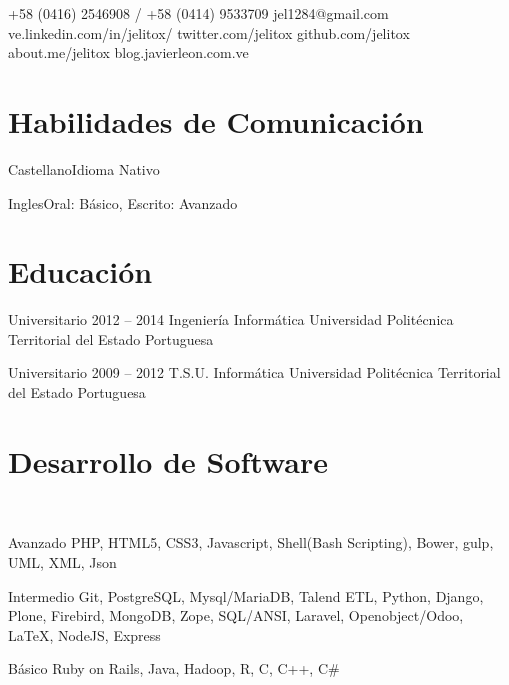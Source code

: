 \documentclass{tccv}
\begin{document}
    {+58 (0416) 2546908 / +58 (0414) 9533709}
    {jel1284@gmail.com}
    {ve.linkedin.com/in/jelitox/}
    {twitter.com/jelitox}
    {github.com/jelitox}
    {about.me/jelitox}
    {blog.javierleon.com.ve}

\section{Habilidades de Comunicaci\'on}

\begin{idiomas}
\item{Castellano}{Idioma Nativo}
\item{Ingles}{Oral: B\'asico, Escrito: Avanzado}
\end{idiomas}
\section{Educaci\'on}

\begin{estudios}

\item[Universitario]{2012 -- 2014}
     {Ingenier\'ia Inform\'atica}
     {Universidad Polit\'ecnica Territorial del Estado Portuguesa}

\item[Universitario]{2009 -- 2012}
     {T.S.U. Inform\'atica}
     {Universidad Polit\'ecnica Territorial del Estado Portuguesa}

\end{estudios}

\section{Desarrollo de Software }

\begin{software}
\\
\item{Avanzado}
     {PHP, HTML5, CSS3, Javascript, Shell(Bash Scripting), Bower, gulp, UML, XML, Json} \\
\item{Intermedio}
     {Git, PostgreSQL, Mysql/MariaDB, Talend ETL, Python, Django, Plone, Firebird, MongoDB, Zope, SQL/ANSI, Laravel, Openobject/Odoo, \LaTeX, NodeJS, Express } \\
\item{B\'asico}
     {Ruby on Rails, Java, Hadoop, R, C, C++, C\#} \\

\end{software}
\end{document}
